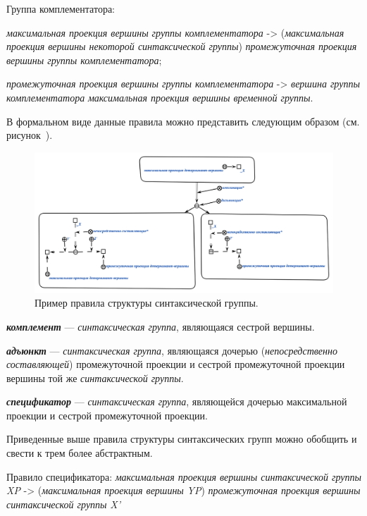 Группа комплементатора:
\begin{textitemize}
    \item \textit{максимальная проекция вершины группы комплементатора} -> (\textit{максимальная проекция вершины некоторой синтаксической группы}) \textit{промежуточная проекция вершины группы комплементатора};
    \item \textit{промежуточная проекция вершины группы комплементатора} -> \textit{вершина группы комплементатора} \textit{максимальная проекция вершины временной группы}.
\end{textitemize}

В формальном виде данные правила можно представить следующим образом (см.
рисунок~\textit{}).

\begin{figure}[h]
    \centering
    \includegraphics[scale=0.8]{images/part2/chapter_lang/tree_structure_rule}
    \caption{Пример правила структуры синтаксической группы.}
    \label{fig:pic_tree_structure_rule}
\end{figure}

\textit{\textbf{комплемент}} --- \textit{синтаксическая группа}, являющаяся сестрой вершины.

\textit{\textbf{адъюнкт}} --- \textit{синтаксическая группа}, являющаяся дочерью (\textit{непосредственно составляющей}) промежуточной проекции и сестрой промежуточной проекции вершины той же \textit{синтаксической группы}.

\textit{\textbf{спецификатор}} --- \textit{синтаксическая группа}, являющейся дочерью максимальной проекции и сестрой промежуточной проекции.

Приведенные выше правила структуры синтаксических групп можно обобщить и свести к трем более абстрактным.

Правило спецификатора: \textit{максимальная проекция вершины синтаксической группы} \textit{XP} -> (\textit{максимальная проекция вершины} \textit{YP}) \textit{промежуточная проекция вершины синтаксической группы} \textit{X'}

